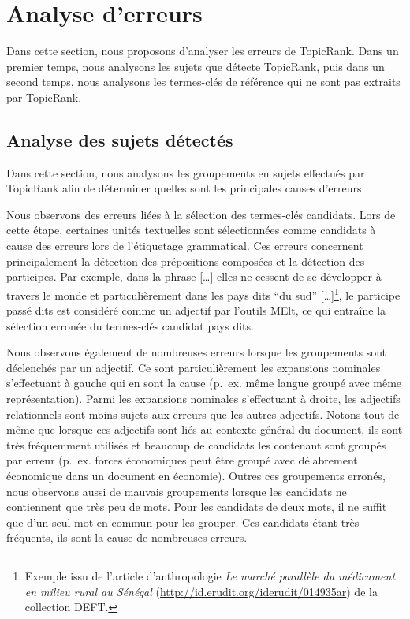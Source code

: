 \section{Analyse d'erreurs}
\label{sec:analyse_d_erreurs}
  Dans cette section, nous proposons d'analyser les erreurs de TopicRank. Dans
  un premier temps, nous analysons les sujets que détecte TopicRank, puis dans
  un second temps, nous analysons les termes-clés de référence qui ne sont pas
  extraits par Topic\-Rank.

  \subsection{Analyse des sujets détectés}
  \label{subsec:analyse_des_sujets_générés}
    Dans cette section, nous analysons les groupements en sujets effectués par
    Topic\-Rank afin de déterminer quelles sont les principales causes
    d'erreurs.

    Nous observons des erreurs liées à la sélection des
    termes-clés candidats. Lors de cette étape, certaines unités textuelles sont
    sélectionnées comme candidats à cause des erreurs lors de l'étiquetage
    grammatical. Ces erreurs concernent principalement la détection des
    prépositions composées et la détection des participes. Par exemple, dans la
    phrase \og{}[\dots] elles ne cessent de se développer à travers le monde et
    particulièrement dans les pays dits ``du sud'' [\dots]\fg{}\footnote{Exemple
    issu de l'article d'anthropologie \textit{Le marché parallèle du médicament
    en milieu rural au Sénégal} (\url{http://id.erudit.org/iderudit/014935ar})
    de la collection DEFT.}, le participe passé \og{}dits\fg{} est considéré
    comme un adjectif par l'outils MElt, ce qui entraîne la sélection erronée du
    termes-clés candidat \og{}pays dits\fg{}.

    Nous observons également de nombreuses erreurs lorsque les
    groupements sont déclenchés par un adjectif. Ce sont particulièrement les
    expansions nominales s'effectuant à gauche qui en sont la cause (p.~ex.
    \og{}même langue\fg{} groupé avec \og{}même représentation\fg{}). Parmi les
    expansions nominales s'effectuant à droite, les adjectifs relationnels sont
    moins sujets aux erreurs que les autres adjectifs. Notons tout de même que
    lorsque ces adjectifs sont liés au contexte général du document, ils sont
    très fréquemment utilisés et beaucoup de candidats les contenant sont
    groupés par erreur (p.~ex. \og{}forces économiques\fg{} peut être groupé 
    avec \og{}délabrement économique\fg{} dans un document en économie). Outres
    ces groupements erronés, nous observons aussi de mauvais groupements lorsque
    les candidats ne contiennent que très peu de mots. Pour les candidats de
    deux mots, il ne suffit que d'un seul mot en commun pour les grouper. Ces
    candidats étant très fréquents, ils sont la cause de nombreuses erreurs.

